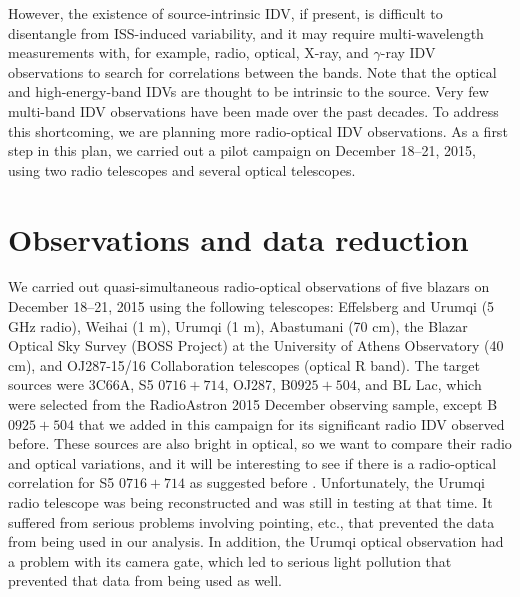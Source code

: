 \documentclass[a4paper,fleqn,usenatbib]{mnras}
\begin{document}
However, the existence of source-intrinsic IDV, if present, is difficult to disentangle from ISS-induced variability, and it may require multi-wavelength measurements with, for example, radio, optical, X-ray, and \(\gamma\)-ray IDV observations to search for correlations between the bands. Note that the optical and high-energy-band IDVs are thought to be intrinsic to the source. Very few multi-band IDV observations have been made over the past decades. To address this shortcoming, we are planning more radio-optical IDV observations. As a first step in this plan, we carried out a pilot campaign on December 18--21, 2015, using two radio telescopes and several optical telescopes.


\section[]{Observations and data reduction}

We carried out quasi-simultaneous radio-optical observations of
five blazars on December 18--21, 2015 using the following
 telescopes: Effelsberg and Urumqi (5 GHz radio),
Weihai (1 m), Urumqi (1 m), Abastumani (70 cm), the Blazar Optical Sky Survey
(BOSS Project) at the University of Athens Observatory (40 cm),
and OJ287-15/16 Collaboration telescopes (optical R band). The target sources were 3C66A, S5 \(0716+714\), OJ287, B\(0925+504\), and BL Lac, which were selected from the RadioAstron 2015 December observing sample, except B\(0925+504\) that we added in this campaign for its significant radio IDV observed before. These sources are also bright in optical, so we want to compare their radio and optical variations, and it will be interesting to see if there is a radio-optical correlation for S5 \(0716+714\) as suggested before \citep{quir91}. Unfortunately, the Urumqi radio telescope was being reconstructed and was still in testing at that time. It suffered from serious problems involving pointing, etc., that prevented the data from being used in our analysis. In addition, the Urumqi optical observation had a problem with its camera gate, which led to serious light pollution that prevented that data from being used as well.
\end{document}
